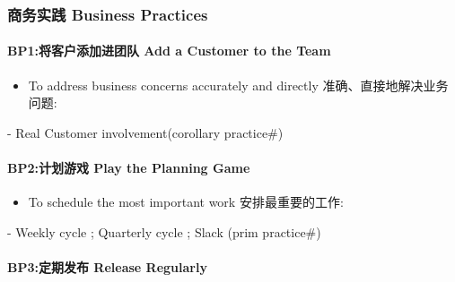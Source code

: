 \documentclass{book}        %
\providecommand{\tightlist}{%
  \setlength{\itemsep}{0pt}\setlength{\parskip}{0pt}}
\let\oldparagraph\paragraph
\renewcommand{\paragraph}[1]{\oldparagraph{#1}\mbox{}}
\begin{document}
\hypertarget{ux5546ux52a1ux5b9eux8df5-business-practices}{%
\subsubsection{商务实践 Business
Practices}\label{ux5546ux52a1ux5b9eux8df5-business-practices}}

\hypertarget{bp1ux5c06ux5ba2ux6237ux6dfbux52a0ux8fdbux56e2ux961f-add-a-customer-to-the-team}{%
\paragraph{BP1:将客户添加进团队 Add a Customer to the
Team}\label{bp1ux5c06ux5ba2ux6237ux6dfbux52a0ux8fdbux56e2ux961f-add-a-customer-to-the-team}}

\begin{itemize}
\tightlist
\item
  To address business concerns accurately and directly
  准确、直接地解决业务问题:
\end{itemize}

\begin{description}
\tightlist
\item[]
- Real Customer involvement(corollary practice\#)
\end{description}

\hypertarget{bp2ux8ba1ux5212ux6e38ux620f-play-the-planning-game}{%
\paragraph{BP2:计划游戏 Play the Planning
Game}\label{bp2ux8ba1ux5212ux6e38ux620f-play-the-planning-game}}

\begin{itemize}
\tightlist
\item
  To schedule the most important work 安排最重要的工作:\\
\end{itemize}

\begin{description}
\tightlist
\item[]
- Weekly cycle ; Quarterly cycle ; Slack (prim practice\#)
\end{description}

\hypertarget{bp3ux5b9aux671fux53d1ux5e03-release-regularly}{%
\paragraph{BP3:定期发布 Release
Regularly}\label{bp3ux5b9aux671fux53d1ux5e03-release-regularly}}
\end{document}
